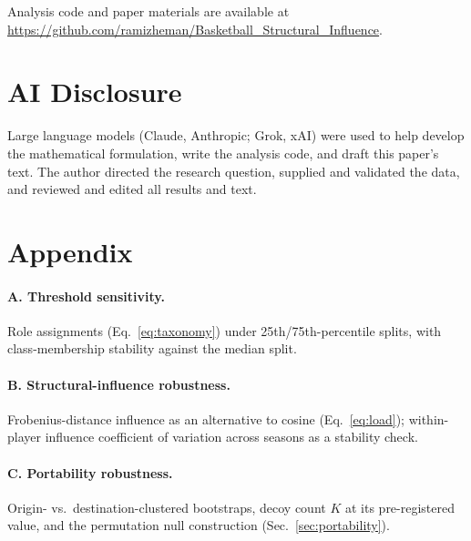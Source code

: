 \documentclass[11pt]{article}
\begin{document}
Analysis code and paper materials are available at
\url{https://github.com/ramizheman/Basketball_Structural_Influence}.

\section*{AI Disclosure}

Large language models (Claude, Anthropic; Grok, xAI) were used to help develop the
mathematical formulation, write the analysis code, and draft this paper's text. The author
directed the research question, supplied and validated the data, and reviewed and edited
all results and text.

\appendix
\section{Appendix}
\label{sec:appendix}

\paragraph{A. Threshold sensitivity.} Role assignments (Eq.~\ref{eq:taxonomy}) under
25th/75th-percentile splits, with class-membership stability against the median split.

\paragraph{B. Structural-influence robustness.} Frobenius-distance influence as an alternative to cosine
(Eq.~\ref{eq:load}); within-player influence coefficient of variation across seasons as a stability
check.

\paragraph{C. Portability robustness.} Origin- vs.\ destination-clustered bootstraps, decoy
count $K$ at its pre-registered value, and the permutation null construction
(Sec.~\ref{sec:portability}).
\label{sec:appendix-portability-robust}
\end{document}
